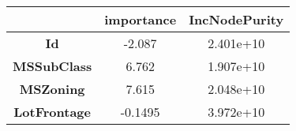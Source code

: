 \documentclass[]{article}
\begin{document}
\begin{longtable}[c]{@{}ccc@{}}
\toprule
\begin{minipage}[b]{0.25\columnwidth}\centering\strut
~
\strut\end{minipage} &
\begin{minipage}[b]{0.16\columnwidth}\centering\strut
importance
\strut\end{minipage} &
\begin{minipage}[b]{0.19\columnwidth}\centering\strut
IncNodePurity
\strut\end{minipage}\tabularnewline
\midrule
\endhead
\begin{minipage}[t]{0.25\columnwidth}\centering\strut
\textbf{Id}
\strut\end{minipage} &
\begin{minipage}[t]{0.16\columnwidth}\centering\strut
-2.087
\strut\end{minipage} &
\begin{minipage}[t]{0.19\columnwidth}\centering\strut
2.401e+10
\strut\end{minipage}\tabularnewline
\begin{minipage}[t]{0.25\columnwidth}\centering\strut
\textbf{MSSubClass}
\strut\end{minipage} &
\begin{minipage}[t]{0.16\columnwidth}\centering\strut
6.762
\strut\end{minipage} &
\begin{minipage}[t]{0.19\columnwidth}\centering\strut
1.907e+10
\strut\end{minipage}\tabularnewline
\begin{minipage}[t]{0.25\columnwidth}\centering\strut
\textbf{MSZoning}
\strut\end{minipage} &
\begin{minipage}[t]{0.16\columnwidth}\centering\strut
7.615
\strut\end{minipage} &
\begin{minipage}[t]{0.19\columnwidth}\centering\strut
2.048e+10
\strut\end{minipage}\tabularnewline
\begin{minipage}[t]{0.25\columnwidth}\centering\strut
\textbf{LotFrontage}
\strut\end{minipage} &
\begin{minipage}[t]{0.16\columnwidth}\centering\strut
-0.1495
\strut\end{minipage} &
\begin{minipage}[t]{0.19\columnwidth}\centering\strut
3.972e+10

\end{minipage}
\end{longtable}
\end{document}

